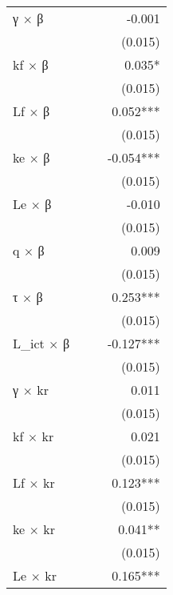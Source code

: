 \begin{tabular}{lrrr}
γ $\times$ β           &            &            &     -0.001 \\ 
                       &            &            &    (0.015) \\ 
kf $\times$ β          &            &            &     0.035* \\ 
                       &            &            &    (0.015) \\ 
Lf $\times$ β          &            &            &   0.052*** \\ 
                       &            &            &    (0.015) \\ 
ke $\times$ β          &            &            &  -0.054*** \\ 
                       &            &            &    (0.015) \\ 
Le $\times$ β          &            &            &     -0.010 \\ 
                       &            &            &    (0.015) \\ 
q $\times$ β           &            &            &      0.009 \\ 
                       &            &            &    (0.015) \\ 
τ $\times$ β           &            &            &   0.253*** \\ 
                       &            &            &    (0.015) \\ 
L\_ict $\times$ β      &            &            &  -0.127*** \\ 
                       &            &            &    (0.015) \\ 
γ $\times$ kr          &            &            &      0.011 \\ 
                       &            &            &    (0.015) \\ 
kf $\times$ kr         &            &            &      0.021 \\ 
                       &            &            &    (0.015) \\ 
Lf $\times$ kr         &            &            &   0.123*** \\ 
                       &            &            &    (0.015) \\ 
ke $\times$ kr         &            &            &    0.041** \\ 
                       &            &            &    (0.015) \\ 
Le $\times$ kr         &            &            &   0.165*** \\ 

\end{tabular}
